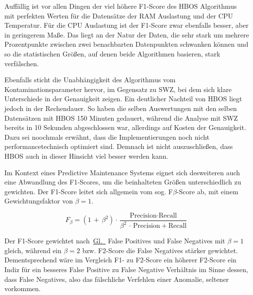 Auffällig ist vor allen Dingen der viel höhere F1-Score des HBOS Algorithmus mit perfekten Werten für die Datensätze der RAM Auslastung und
der CPU Temperatur. Für die CPU Auslastung ist der F1-Score zwar ebenfalls besser, aber in geringerem Maße. Das liegt an der Natur der Daten,
die sehr stark um mehrere Prozentpunkte zwischen zwei benachbarten Datenpunkten schwanken können und so die statistischen Größen, auf denen
beide Algorithmen basieren, stark verfälschen.

Ebenfalls sticht die Unabhängigkeit des Algorithmus vom Kontaminationsparameter hervor, im Gegensatz zu SWZ, bei dem sich klare Unterschiede
in der Genauigkeit zeigen. Ein deutlicher Nachteil von HBOS liegt jedoch in der Rechendauer. So haben die selben Auswertungen mit den selben
Datensätzen mit HBOS 150 Minuten gedauert, während die Analyse mit SWZ bereits in 10 Sekunden  abgeschlossen war, allerdings auf Kosten der
Genauigkeit. Dazu sei noochmals erwähnt, dass die Implementierungen noch nicht performancetechnisch optimiert sind. Demnach ist nicht
auszuschließen, dass HBOS auch in dieser Hinsicht viel besser werden kann.

Im Kontext eines Predictive Maintenance Systems eignet sich desweiteren auch eine Abwandlung des F1-Scores, um die beinhalteten Größen
unterschiedlich zu gewichten. Der F1-Score leitet sich allgemein vom sog. F$\beta$-Score ab, mit einem Gewichtungsfaktor von $\beta=1$.

\begin{equation}
    F_{\beta} = (1\,+\,\beta^2) \cdot \frac{\text{Precision} \cdot \text{Recall}}{\beta^2\,\cdot\,\text{Precision} + \text{Recall}}
    \label{eq:fbeta}
\end{equation}

Der F1-Score gewichtet nach~\hyperref[eq:fbeta]{Gl.~} False Positives und False Negatives mit $\beta=1$ gleich, während
ein $\beta=2$ bzw. F2-Score die False Negatives stärker gewichtet. Dementsprechend wäre im Vergleich F1- zu F2-Score ein höherer F2-Score ein
Indiz für ein besseres False Positive zu False Negative Verhältnis im Sinne dessen, dass False Negatives, also das fälschliche Verfehlen
einer Anomalie, seltener vorkommen.


